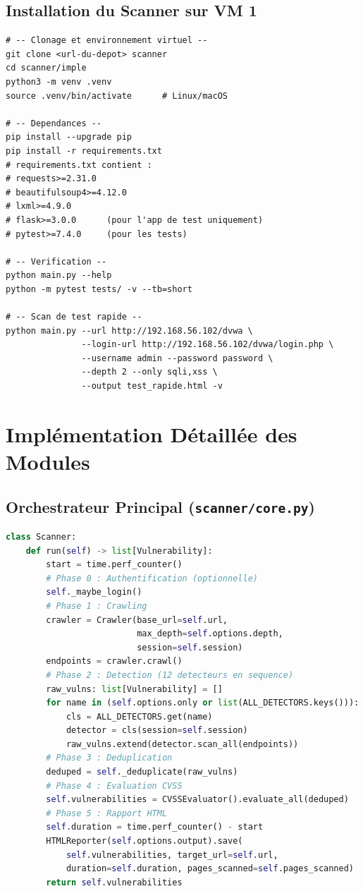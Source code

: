 \documentclass[12pt,a4paper]{report}
\begin{document}
\subsection{Installation du Scanner sur VM 1}

\begin{lstlisting}[style=bash, caption={Installation et premier test du scanner (VM 1)}]
# -- Clonage et environnement virtuel --
git clone <url-du-depot> scanner
cd scanner/imple
python3 -m venv .venv
source .venv/bin/activate      # Linux/macOS

# -- Dependances --
pip install --upgrade pip
pip install -r requirements.txt
# requirements.txt contient :
# requests>=2.31.0
# beautifulsoup4>=4.12.0
# lxml>=4.9.0
# flask>=3.0.0      (pour l'app de test uniquement)
# pytest>=7.4.0     (pour les tests)

# -- Verification --
python main.py --help
python -m pytest tests/ -v --tb=short

# -- Scan de test rapide --
python main.py --url http://192.168.56.102/dvwa \
               --login-url http://192.168.56.102/dvwa/login.php \
               --username admin --password password \
               --depth 2 --only sqli,xss \
               --output test_rapide.html -v
\end{lstlisting}

\section{Implémentation Détaillée des Modules}

\subsection{Orchestrateur Principal (\texttt{scanner/core.py})}

\begin{lstlisting}[language=python, caption={Méthode Scanner.run() — orchestration du pipeline}]
class Scanner:
    def run(self) -> list[Vulnerability]:
        start = time.perf_counter()
        # Phase 0 : Authentification (optionnelle)
        self._maybe_login()
        # Phase 1 : Crawling
        crawler = Crawler(base_url=self.url,
                          max_depth=self.options.depth,
                          session=self.session)
        endpoints = crawler.crawl()
        # Phase 2 : Detection (12 detecteurs en sequence)
        raw_vulns: list[Vulnerability] = []
        for name in (self.options.only or list(ALL_DETECTORS.keys())):
            cls = ALL_DETECTORS.get(name)
            detector = cls(session=self.session)
            raw_vulns.extend(detector.scan_all(endpoints))
        # Phase 3 : Deduplication
        deduped = self._deduplicate(raw_vulns)
        # Phase 4 : Evaluation CVSS
        self.vulnerabilities = CVSSEvaluator().evaluate_all(deduped)
        # Phase 5 : Rapport HTML
        self.duration = time.perf_counter() - start
        HTMLReporter(self.options.output).save(
            self.vulnerabilities, target_url=self.url,
            duration=self.duration, pages_scanned=self.pages_scanned)
        return self.vulnerabilities
\end{lstlisting}
\end{document}
